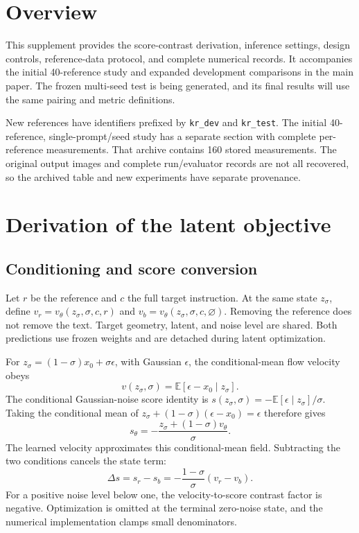 \section{Overview}
This supplement provides the score-contrast derivation, inference settings,
design controls, reference-data protocol, and complete numerical records.
It accompanies the initial 40-reference study and expanded development
comparisons in the main paper.
The frozen multi-seed test is being generated, and its final results will
use the same pairing and metric definitions.

New references have identifiers prefixed by \texttt{kr\_dev} and
\texttt{kr\_test}. The initial 40-reference, single-prompt/seed study has a separate section
with complete per-reference measurements.
That archive contains 160 stored measurements. The original output images
and complete run/evaluator records are not all recovered, so the archived
table and new experiments have separate provenance.

\section{Derivation of the latent objective}
\subsection{Conditioning and score conversion}
Let $r$ be the reference and $c$ the full target instruction. At the same
state $z_\sigma$, define $v_r=v_\theta(z_\sigma,\sigma,c,r)$ and
$v_b=v_\theta(z_\sigma,\sigma,c,\varnothing)$. Removing the reference
does not remove the text. Target geometry, latent, and noise level are
shared. Both predictions use frozen weights and are detached during latent
optimization.

For $z_\sigma=(1-\sigma)x_0+\sigma\epsilon$, with Gaussian $\epsilon$,
the conditional-mean flow velocity obeys
\begin{equation}
v(z_\sigma,\sigma)=\mathbb E[\epsilon-x_0\mid z_\sigma].
\end{equation}
The conditional Gaussian-noise score identity is
$s(z_\sigma,\sigma)=-\mathbb E[\epsilon\mid z_\sigma]/\sigma$.
Taking the conditional mean of
$z_\sigma+(1-\sigma)(\epsilon-x_0)=\epsilon$ therefore gives
\begin{equation}
s_\theta=-\frac{z_\sigma+(1-\sigma)v_\theta}{\sigma}.
\end{equation}
The learned velocity approximates this conditional-mean field. Subtracting the two conditions cancels the state term:
\begin{equation}
\Delta s=s_r-s_b=-\frac{1-\sigma}{\sigma}(v_r-v_b).
\end{equation}
For a positive noise level below one, the velocity-to-score contrast factor
is negative. Optimization is omitted at the terminal zero-noise state,
and the numerical implementation clamps small denominators.

